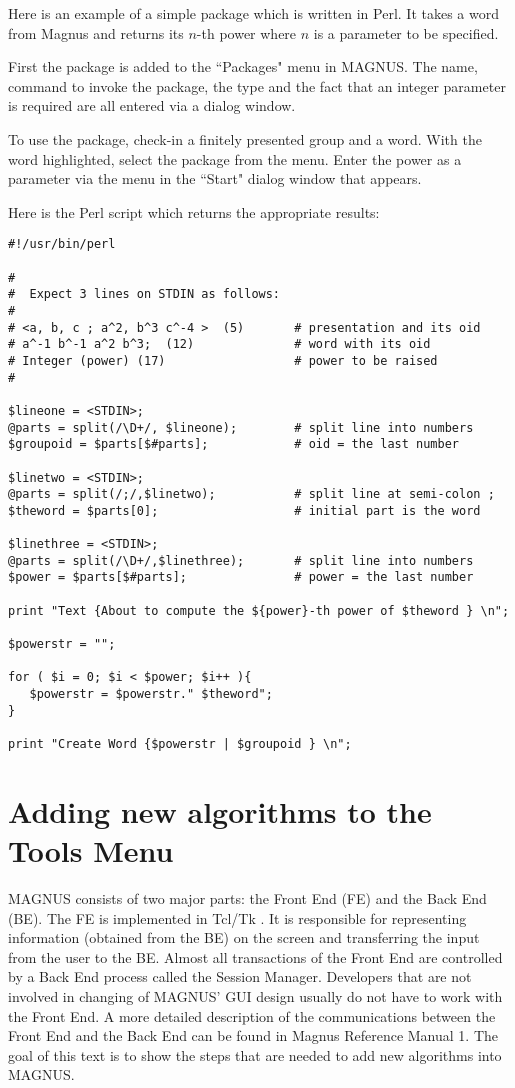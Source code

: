 \documentclass[12pt]{article}
\def\magnus{MAGNUS }
\def\nsmagnus{MAGNUS}
\begin{document}
Here is an example of a simple package which is written in Perl.
It takes a word from Magnus and returns its $n$-th power where
$n$ is a parameter to be specified.

First the package is added to the ``Packages" menu in \nsmagnus. The name,
command to invoke the package, the type and the fact that an integer
parameter is required are all entered via a dialog window.

To use the package, check-in a finitely presented group and a word.
With the word highlighted, select the package from the menu. Enter
the power as a parameter via the menu in the ``Start" dialog window 
that appears.

Here is the Perl script which returns the appropriate results:

\begin{verbatim}
#!/usr/bin/perl

#
#  Expect 3 lines on STDIN as follows:
#
# <a, b, c ; a^2, b^3 c^-4 >  (5)       # presentation and its oid
# a^-1 b^-1 a^2 b^3;  (12)              # word with its oid
# Integer (power) (17)                  # power to be raised
#

$lineone = <STDIN>;
@parts = split(/\D+/, $lineone);        # split line into numbers
$groupoid = $parts[$#parts];            # oid = the last number

$linetwo = <STDIN>;
@parts = split(/;/,$linetwo);           # split line at semi-colon ;
$theword = $parts[0];                   # initial part is the word

$linethree = <STDIN>;
@parts = split(/\D+/,$linethree);       # split line into numbers
$power = $parts[$#parts];               # power = the last number

print "Text {About to compute the ${power}-th power of $theword } \n";

$powerstr = "";

for ( $i = 0; $i < $power; $i++ ){
   $powerstr = $powerstr." $theword";
}

print "Create Word {$powerstr | $groupoid } \n";
\end{verbatim}




\section{Adding new algorithms to the Tools Menu}


  \magnus consists of two major parts: the Front End (FE) and  the Back End (BE). 
  The FE is implemented in Tcl/Tk . It is responsible for representing information 
  (obtained from the BE) on the screen and transferring the input from the user to 
  the BE. 
  Almost all transactions of the Front End are controlled by a Back End process
  called the 
  Session Manager. Developers  that are not involved in changing of \nsmagnus' GUI design 
  usually do not have to work with the Front End. A more detailed description of the 
  communications between the Front End and the Back End can be found in Magnus 
  Reference Manual 1. The goal of this text is to show the steps that are
  needed to add new  algorithms into \nsmagnus.
\end{document}
